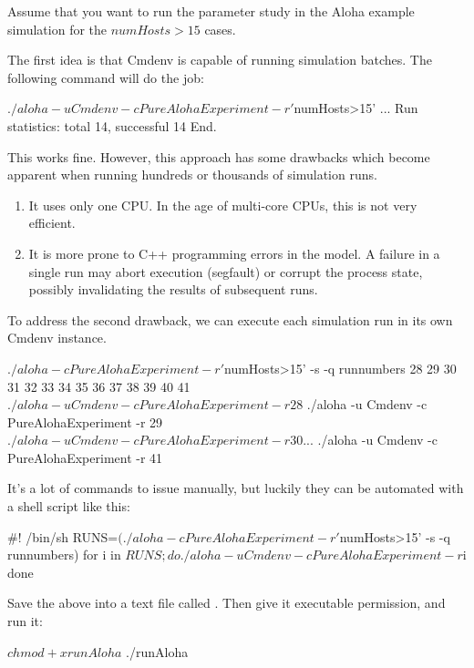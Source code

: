 Assume that you want to run the parameter study in the Aloha example
simulation for the $numHosts>15$ cases.

The first idea is that Cmdenv is capable of running simulation batches.
The following command will do the job:

\begin{commandline}
$ ./aloha -u Cmdenv -c PureAlohaExperiment -r '$numHosts>15'
...
Run statistics: total 14, successful 14
End.
\end{commandline}

This works fine. However, this approach has some drawbacks which become
apparent when running hundreds or thousands of simulation runs.

\begin{enumerate}
  \item It uses only one CPU. In the age of multi-core CPUs, this is not
        very efficient.
  \item It is more prone to C++ programming errors in the model. A failure in a single
        run may abort execution (segfault) or corrupt the process
        state, possibly invalidating the results of subsequent runs.
\end{enumerate}

To address the second drawback, we can execute each simulation run in its own
Cmdenv instance.

\begin{commandline}
$ ./aloha -c PureAlohaExperiment -r '$numHosts>15' -s -q runnumbers
28 29 30 31 32 33 34 35 36 37 38 39 40 41
$ ./aloha -u Cmdenv -c PureAlohaExperiment -r 28
$ ./aloha -u Cmdenv -c PureAlohaExperiment -r 29
$ ./aloha -u Cmdenv -c PureAlohaExperiment -r 30
...
$ ./aloha -u Cmdenv -c PureAlohaExperiment -r 41
\end{commandline}

It's a lot of commands to issue manually, but luckily they can be automated with a
shell script like this:

\begin{filelisting}
#! /bin/sh
RUNS=$(./aloha -c PureAlohaExperiment -r '$numHosts>15' -s -q runnumbers)
for i in $RUNS; do
    ./aloha -u Cmdenv -c PureAlohaExperiment -r $i
done
\end{filelisting}

Save the above into a text file called . Then give it
executable permission, and run it:

\begin{commandline}
$ chmod +x runAloha
$ ./runAloha
\end{commandline}

